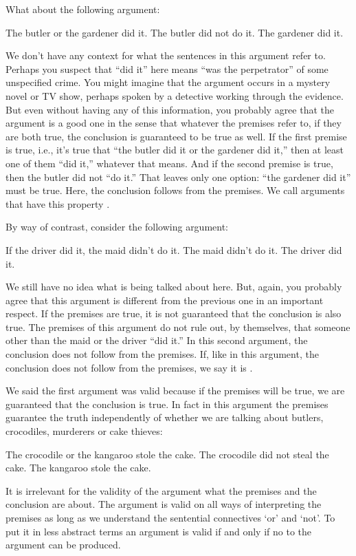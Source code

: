 What about the following argument:
\begin{earg}
	\prem The butler or the gardener did it.
	\prem The butler did not do it.
	\conc The gardener did it.
\end{earg}
We don't have any context for what the sentences in this argument refer to. Perhaps you suspect that ``did it'' here means ``was the perpetrator'' of some unspecified crime. You might imagine that the argument occurs in a mystery novel or TV show, perhaps spoken by a detective working through the evidence. But even without having any of this information, you probably agree that the argument is a good one in the sense that whatever the premises refer to, if they are both true, the conclusion is guaranteed to be true as well. If the first premise is true, i.e., it's true that ``the butler did it or the gardener did it,'' then at least one of them ``did it,'' whatever that means. And if the second premise is true, then the butler did not ``do it.'' That leaves only one option: ``the gardener did it'' must be true. Here, the conclusion follows from the premises. We call arguments that have this property .

By way of contrast, consider the following argument:
\begin{earg}\label{argMaidDriver}
	\prem If the driver did it, the maid didn't do it.
	\prem The maid didn't do it.
	\conc The driver did it.
\end{earg}
We still have no idea what is being talked about here. But, again, you probably agree that this argument is different from the previous one in an important respect. If the premises are true, it is not guaranteed that the conclusion is also true. The premises of this argument do not rule out, by themselves, that someone other than the maid or the driver ``did it.'' In this second argument, the conclusion does not follow from the premises. If, like in this argument, the conclusion does not follow from the premises, we say it is .

We said the first argument was valid because if the premises will be true, we are guaranteed  that the conclusion is true. In fact in this argument the premises guarantee the truth independently of whether we are talking about butlers, crocodiles, murderers or cake thieves:
\begin{earg}\label{argMaidDriver}
	\prem The crocodile or the kangaroo stole the cake.
	\prem The crocodile did not steal the cake.
	\conc The kangaroo stole the cake.
\end{earg}
 It is irrelevant for the validity of the argument what the premises and the conclusion are about. The argument is valid on all ways of interpreting the premises as long as we understand the sentential connectives `or' and `not'. To put it in less abstract terms an argument is valid if and only if no  to the argument can be produced. 


